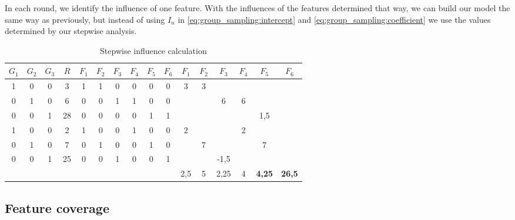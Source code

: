 \documentclass[../../thesis.tex]{subfiles}
\begin{document}
In each round, we identify the influence of one feature. With the influences of the features determined that way, we can build our
model the same way as previously, but instead of using $I_n$ in \autoref{eq:group_sampling:intercept} and \autoref{eq:group_sampling:coefficient}
we use the values determined by our stepwise analysis.

\begin{table}[h]
  \caption{ Stepwise influence calculation }
  \begin{center}
    \begin{tabular}{ccc|c|cccccc|cccccc}\toprule
      $G_1$                 & $G_2$ & $G_3$ & $R$  & $F_1$ & $F_2$         & $F_3$         & $F_4$ & $F_5$ & $F_6$ & $F_1$ & $F_2$ & $F_3$ & $F_4$ & $F_5$ & $F_6$ \\ \midrule
      1                     & 0     & 0     & 3    & 1     & 1             & 0             & 0     & 0     & 0     & 3     & 3     &       &       &       &       \\
      0                     & 1     & 0     & 6    & 0     & 0             & 1             & 1     & 0     & 0     &       &       & 6     & 6     &       &       \\
      0                     & 0     & 1     & 28   & 0     & 0             & 0             & 0     & 1     & 1     &       &       &       &       & 1,5   &       \\ \midrule
      1                     & 0     & 0     & 2    & 1     & 0             & 0             & 1     & 0     & 0     & 2     &       &       & 2     &       &       \\
      0                     & 1     & 0     & 7    & 0     & 1             & 0             & 0     & 1     & 0     &       & 7     &       &       & 7     &       \\
      0                     & 0     & 1     & 25   & 0     & 0             & 1             & 0     & 0     & 1     &       &       & -1,5  &       &       &       \\ \midrule
      \multicolumn{10}{l}{} & 2,5   & 5     & 2,25 & 4     & \textbf{4,25} & \textbf{26,5}                                                                         \\ \midrule
    \end{tabular}
  \end{center}\label{tab:optimization:feature_influence}%
\end{table}

\subsection{Feature coverage}\label{sec:optimization:feature_coverage}
\end{document}
